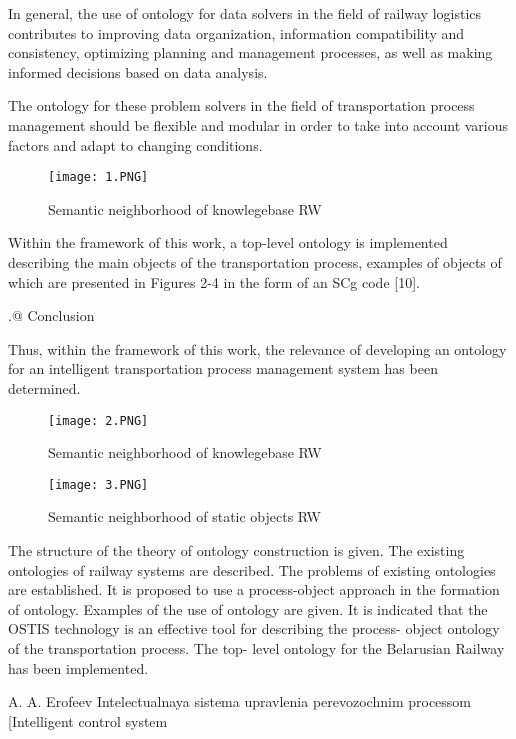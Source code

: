 \documentclass[a4paper]{article}
\makeatletter
\newcommand*{\rom}[1]{\expandafter\@slowromancap\romannumeral #1@}
\makeatother
\begin{document}
\begin{multicols}{2}
In general, the use of ontology for data solvers in the field of railway logistics contributes to improving data
organization, information compatibility and consistency,
optimizing planning and management processes, as well
as making informed decisions based on data analysis.

The ontology for these problem solvers in the field of transportation process management should be flexible
and modular in order to take into account various factors
and adapt to changing conditions.
\setcounter{figure}{1}
\begin{figure}[H]
    \centering
    \texttt{[image: 1.PNG]}
    \caption{Semantic neighborhood of knowlegebase RW}
    \label{fig:enter-label}
\end{figure}
Within the framework of this work, a top-level ontology is implemented describing the main objects of the
transportation process, examples of objects of which are
presented in Figures 2-4 in the form of an SCg code [10].
\begin{center}
  \rom{5.} Conclusion  
\end{center} \par
\fontsize{10}{10}\selectfont
Thus, within the framework of this work, the relevance
of developing an ontology for an intelligent transportation process management system has been determined.
\begin{figure}[H]
    \centering
    \texttt{[image: 2.PNG]}
    \caption{Semantic neighborhood of knowlegebase RW}
    \label{fig:enter-label}
\end{figure}
\begin{figure}[H]
    \centering
    \texttt{[image: 3.PNG]}
    \caption{Semantic neighborhood of static objects RW}
    \label{fig:enter-label}
\end{figure}
\fontsize{10}{10}\selectfont
The structure of the theory of ontology construction
is given. The existing ontologies of railway systems
are described. The problems of existing ontologies are
established. It is proposed to use a process-object approach in the formation of ontology. Examples of the
use of ontology are given. It is indicated that the OSTIS
technology is an effective tool for describing the process-
object ontology of the transportation process. The top-
level ontology for the Belarusian Railway has been
implemented.
\fontsize{8}{9}\selectfont
\begin{thebibliography}{10}
     A. A. Erofeev Intelectualnaya sistema upravlenia
perevozochnim processom [Intelligent control system

\end{thebibliography}
\end{multicols}
\end{document}
